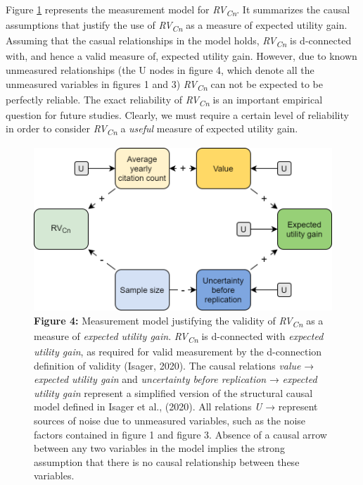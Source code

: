 \documentclass[
  english,
  man,floatsintext]{apa6}
\begin{document}
Figure \ref{fig:4} represents the measurement model for \emph{RV\textsubscript{Cn}}. It summarizes the causal assumptions that justify the use of \emph{RV\textsubscript{Cn}} as a measure of expected utility gain. Assuming that the casual relationships in the model holds, \emph{RV\textsubscript{Cn}} is d-connected with, and hence a valid measure of, expected utility gain. However, due to known unmeasured relationships (the U nodes in figure 4, which denote all the unmeasured variables in figures 1 and 3) \emph{RV\textsubscript{Cn}} can not be expected to be perfectly reliable. The exact reliability of \emph{RV\textsubscript{Cn}} is an important empirical question for future studies. Clearly, we must require a certain level of reliability in order to consider \emph{RV\textsubscript{Cn}} a \emph{useful} measure of expected utility gain.

\begin{figure}
\centering
\includegraphics{figure_4.png}
\caption{\textbf{Figure 4:} Measurement model justifying the validity of \emph{RV\textsubscript{Cn}} as a measure of \emph{expected utility gain}. \emph{RV\textsubscript{Cn}} is d-connected with \emph{expected utility gain}, as required for valid measurement by the d-connection definition of validity (Isager, 2020). The causal relations \emph{value} → \emph{expected utility gain} and \emph{uncertainty before replication} → \emph{expected utility gain} represent a simplified version of the structural causal model defined in Isager et al., (2020). All relations \emph{U} → represent sources of noise due to unmeasured variables, such as the noise factors contained in figure 1 and figure 3. Absence of a causal arrow between any two variables in the model implies the strong assumption that there is no causal relationship between these variables. \label{fig:4}}
\end{figure}
\end{document}

